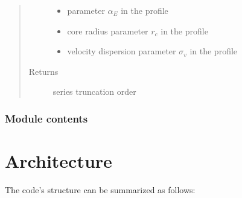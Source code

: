 \documentclass[letterpaper,10pt,english]{sphinxmanual}
\begin{document}
\begin{fulllineitems}
\begin{quote}
\begin{description}
\begin{itemize}
\item {} 
\sphinxAtStartPar
{} \textendash{} parameter \(\alpha_E\) in the {\hyperref[\detokenize{diffsph.profiles:diffsph.profiles.templates.enst}]{}} profile

\item {} 
\sphinxAtStartPar
{} \textendash{} core radius parameter \(r_c\) in the {\hyperref[\detokenize{diffsph.profiles:diffsph.profiles.templates.cnfw}]{}} profile

\item {} 
\sphinxAtStartPar
{} \textendash{} velocity dispersion parameter \(\sigma_v\) in the {\hyperref[\detokenize{diffsph.profiles:diffsph.profiles.templates.sis}]{}} profile

\end{itemize}

\item[{Returns}] \leavevmode
\sphinxAtStartPar
series truncation order 

\end{description}\end{quote}

\end{fulllineitems}



\subsection{Module contents}
\label{\detokenize{diffsph:module-diffsph}}\label{\detokenize{diffsph:module-contents}}
\begin{DUlineblock}{0em}
\item[] 
\end{DUlineblock}


\chapter{Architecture}
\label{\detokenize{index:architecture}}
\sphinxAtStartPar
The code’s structure can be summarized as follows:
\end{document}
